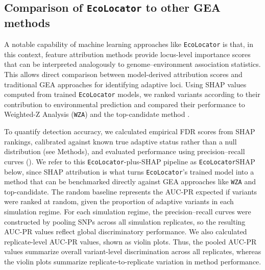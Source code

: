 \documentclass[]{article}
\newcommand{\ecolocator}{\texttt{EcoLocator}\xspace}
\begin{document}
\subsection{Comparison of \ecolocator to other GEA methods}

A notable capability of machine learning approaches like \ecolocator is that,
in this context,
feature attribution methods provide locus-level importance scores
that can be interpreted analogously to genome--environment association statistics.
This allows direct comparison between model-derived attribution scores
and traditional GEA approaches for identifying adaptive loci.
Using SHAP values computed from trained \ecolocator models,
we ranked variants according to their contribution to environmental prediction
and compared their performance to Weighted-Z Analysis (\texttt{WZA})
\citep{booker_wza_2024}
and the top-candidate method \citep{yeaman_convergent_2016}.

To quantify detection accuracy,
we calculated empirical FDR scores
from SHAP rankings, calibrated against known true adaptive status
rather than a null distribution (see Methods),
and evaluated performance using precision--recall curves
(). We refer to this \ecolocator-plus-SHAP pipeline
as \ecolocator\texttimes{}SHAP below, since SHAP attribution is what turns
\ecolocator's trained model into a method that can be benchmarked directly
against GEA approaches like \texttt{WZA}
and top-candidate. The random baseline represents the AUC-PR
expected if variants were ranked at random,
given the proportion of adaptive variants in each simulation regime.
For each simulation regime,
the precision--recall curves were constructed by pooling SNPs
across all simulation replicates,
so the resulting AUC-PR values reflect global discriminatory performance.
We also calculated replicate-level AUC-PR values,
shown as violin plots.
Thus,
the pooled AUC-PR values summarize overall variant-level discrimination
across all replicates,
whereas the violin plots summarize replicate-to-replicate variation
in method performance.
\end{document}
